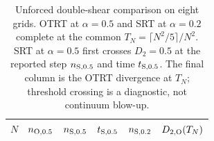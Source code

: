 \begin{table}[htbp]

\centering
\caption{Unforced double-shear comparison on eight grids. OTRT at $\alpha=0.5$ and SRT at $\alpha=0.2$ complete at the common $T_N=\lceil N^2/5\rceil/N^2$. SRT at $\alpha=0.5$ first crosses $D_2=0.5$ at the reported step $n_{\rm S,0.5}$ and time $t_{\rm S,0.5}$. The final column is the OTRT divergence at $T_N$; threshold crossing is a diagnostic, not continuum blow-up.}
\label{tab:numerical-double-shear-alpha}
\begingroup
\scriptsize
\setlength{\tabcolsep}{3.2pt}
\begin{tabular}{@{}rrrrrr@{}}
\toprule
$N$ & $n_{\rm O,0.5}$ & $n_{\rm S,0.5}$ & $t_{\rm S,0.5}$ & $n_{\rm S,0.2}$ & $D_{2,\rm O}(T_N)$\\
\midrule
\bottomrule
\end{tabular}
\endgroup
\end{table}
